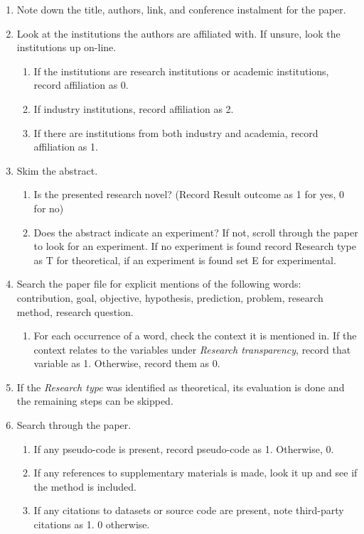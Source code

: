 \begin{enumerate}
\item Note down the title, authors, link, and conference instalment for the paper.
\item Look at the institutions the authors are affiliated with. If unsure, look the institutions up on-line.
    \begin{enumerate}
    \item If the institutions are research institutions or academic institutions, record affiliation as 0.
    \item If industry institutions, record affiliation as 2.
    \item If there are institutions from both industry and academia, record affiliation as 1.
    \end{enumerate}
\item Skim the abstract.
    \begin{enumerate}
    \item Is the presented research novel? (Record Result outcome as 1 for yes, 0 for no)
    \item Does the abstract indicate an experiment? If not, scroll through the paper to look for an experiment. If no experiment is found record Research type as T for theoretical, if an experiment is found set E for experimental.
    \end{enumerate}
\item Search the paper file for explicit mentions of the following words: contribution, goal, objective, hypothesis, prediction, problem, research method, research question.
    \begin{enumerate}
    \item For each occurrence of a word, check the context it is mentioned in. If the context relates to the variables under \emph{Research transparency}, record that variable as 1. Otherwise, record them as 0.
    \end{enumerate}
\item If the \emph{Research type} was identified as theoretical, its evaluation is done and the remaining steps can be skipped.
\item Search through the paper.
    \begin{enumerate}
    \item If any pseudo-code is present, record pseudo-code as 1. Otherwise, 0.
    \item If any references to supplementary materials is made, look it up and see if the method is included.
    \item If any citations to datasets or source code are present, note third-party citations as 1. 0 otherwise.

\end{enumerate}
\end{enumerate}
